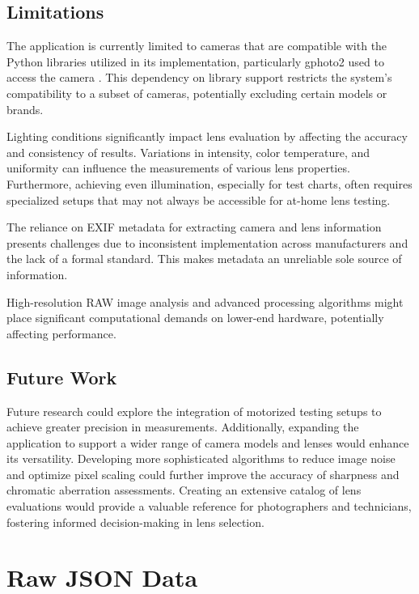 \documentclass{book}
\begin{document}
\section{Limitations}
The application is currently limited to cameras that are compatible with the Python libraries utilized in its implementation, particularly gphoto2 used to access the camera \cite{gphoto2_compatible}. This dependency on library support restricts the system’s compatibility to a subset of cameras, potentially excluding certain models or brands.

Lighting conditions significantly impact lens evaluation by affecting the accuracy and consistency of results. Variations in intensity, color temperature, and uniformity can influence the measurements of various lens properties. Furthermore, achieving even illumination, especially for test charts, often requires specialized setups that may not always be accessible for at-home lens testing.

The reliance on EXIF metadata for extracting camera and lens information presents challenges due to inconsistent implementation across manufacturers and the lack of a formal standard. This makes metadata an unreliable sole source of information.

High-resolution RAW image analysis and advanced processing algorithms might place significant computational demands on lower-end hardware, potentially affecting performance.

\section{Future Work}

Future research could explore the integration of motorized testing setups to achieve greater precision in measurements. Additionally, expanding the application to support a wider range of camera models and lenses would enhance its versatility. Developing more sophisticated algorithms to reduce image noise and optimize pixel scaling could further improve the accuracy of sharpness and chromatic aberration assessments. Creating an extensive catalog of lens evaluations would provide a valuable reference for photographers and technicians, fostering informed decision-making in lens selection.

\appendix

\chapter{Raw JSON Data}
\end{document}
